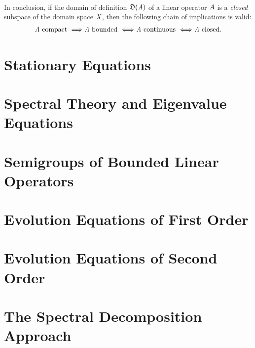 \documentclass[11pt,twoside]{article}
\begin{document}
\paragraph{} %
In conclusion,
if the domain of definition $\mathfrak{D}(\mathit{A})$ of a linear operator $\mathit{A}$
is a \textit{closed} subspace of the domain space $\mathit{X}$,
then the following chain of implications is valid:
\[
\linA \mbox{ compact }    \Longrightarrow
\linA \mbox{ bounded }    \Longleftrightarrow
\linA \mbox{ continuous } \Longleftrightarrow
\linA \mbox{ closed}. %
\]

\section{Stationary Equations}

\section{Spectral Theory and Eigenvalue Equations}

\section{Semigroups of Bounded Linear Operators}

\section{Evolution Equations of First Order}

\section{Evolution Equations of Second Order}

\section{The Spectral Decomposition Approach}
\end{document}

